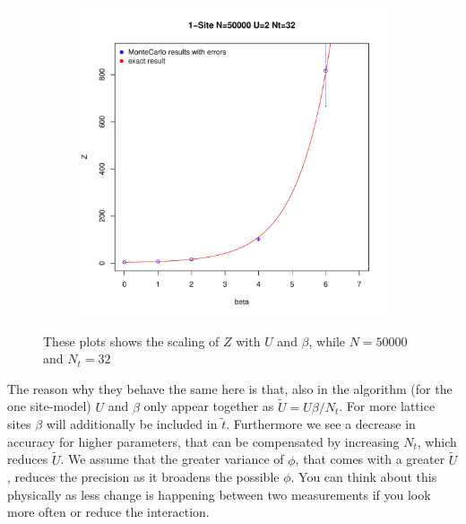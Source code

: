 \begin{figure}
\begin{subfigure}[c]{0.5\textwidth}
	\end{subfigure}
	\begin{subfigure}[c]{0.5\textwidth}
		\includegraphics[width=1\textwidth]{figs/plot_Z1b}
	\end{subfigure}
	\caption{These plots shows the scaling of $Z$ with $U$ and $\beta$, while $N=50000$ and $N_t=32$}
	\label{fig:Ub}
\end{figure}
The reason why they behave the same here is that, also in the algorithm (for the one site-model) $U$ and $\beta$ only appear together as $\tilde{U}=U\beta/N_t$. For more lattice sites $\beta$ will additionally be included in $\tilde{t}$.
Furthermore we see a decrease in accuracy for higher parameters, that can be compensated by increasing $N_t$, which reduces $\tilde{U}$. We assume that the greater variance of $\phi$, that comes with a greater $\tilde{U}$, reduces the precision as it broadens the possible $\phi$.
You can think about this physically as less change is happening between two measurements if you look more often or reduce the interaction.
